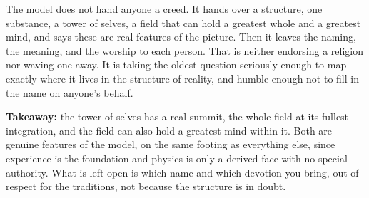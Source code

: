 The model does not hand anyone a creed. It hands over a structure, one substance, a tower of selves, a field that can hold a greatest whole and a greatest mind, and says these are real features of the picture. Then it leaves the naming, the meaning, and the worship to each person. That is neither endorsing a religion nor waving one away. It is taking the oldest question seriously enough to map exactly where it lives in the structure of reality, and humble enough not to fill in the name on anyone's behalf.

\textbf{Takeaway:} the tower of selves has a real summit, the whole field at its fullest integration, and the field can also hold a greatest mind within it. Both are genuine features of the model, on the same footing as everything else, since experience is the foundation and physics is only a derived face with no special authority. What is left open is which name and which devotion you bring, out of respect for the traditions, not because the structure is in doubt.
